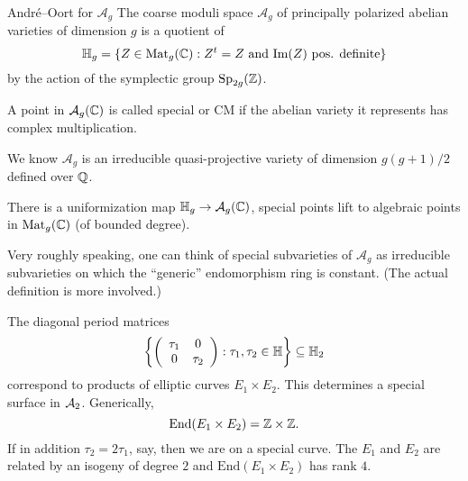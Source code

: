 \documentclass{beamer}
\begin{document}
\begin{frame}{Andr\'e--Oort for $\mathcal{A}_g$}
  The coarse moduli space $\mathcal{A}_g$ of principally polarized abelian varieties
  of dimension $g$ is a quotient of
  \begin{equation*}
    {\mathbb{H}}_g = \{Z\in \mathrm{Mat}_{g}({{\mathbb{C}}}) : Z^t = Z \text{ and }
    \mathrm{Im}(Z) \text{ pos. definite}\}
  \end{equation*}
  by the action of the symplectic group $\mathrm{Sp}_{2g}({\mathbb{Z}})$.
  
  \begin{definition}
    A point in $\mathcal{A}_g({\mathbb{C}})$ is called \alert{special} or
    \alert{CM}
    if the abelian
    variety  it represents has complex
    multiplication. 
  \end{definition}

  We know $\mathcal{A}_g$ is an irreducible quasi-projective variety of
  dimension $g(g+1)/2$ defined over ${\mathbb{Q}}$.
  
  There is a uniformization map
    ${\mathbb{H}}_g \rightarrow \mathcal{A}_g({\mathbb{C}})$,
  special points lift to algebraic points in $\mathrm{Mat}_{g}({{\mathbb{C}}})$ (of
  bounded degree).
\end{frame}

\begin{frame}
  Very roughly speaking, one can think of special subvarieties of
  $\mathcal{A}_g$ as irreducible subvarieties on which the ``generic''
  endomorphism ring is constant. (The actual definition is more
  involved.)

  \begin{example}[Abelian surfaces, so $g=2$,  here $\dim \cA_2=3$]
    The diagonal period matrices
    \begin{equation*}
      \left\{\left( \begin{array}{cc} {\tau_1} & {0} \\ {0} & {\tau_2} \end{array} \right) : \tau_1,\tau_2\in{\mathbb{H}}
      \right\} \subseteq {\mathbb{H}}_2
    \end{equation*}
    correspond to products of elliptic curves $E_1\times E_2$. This
    determines 
    a \alert{special surface} in ${\mathcal A}_2$. Generically, 
    \begin{equation*}
      \mathrm{End}(E_1\times E_2) ={\mathbb{Z}}\times{\mathbb{Z}}. 
    \end{equation*}
    If in addition $\tau_2=2\tau_1$, say, then we are on a \alert{special curve}.
    The $E_1$ and $E_2$ are related by an isogeny of degree $2$
    and $\mathrm{End}(E_1\times E_2)$ has rank $4$. 
  \end{example}
\end{frame}
\end{document}
